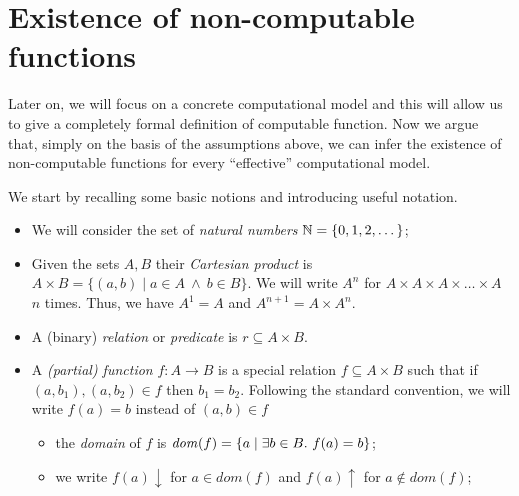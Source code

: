\section{Existence of non-computable functions}

Later on, we will focus on a concrete computational model and this
will allow us to give a completely formal definition of computable
function. Now we argue that, simply on the basis of the assumptions
above, we can infer the existence of non-computable functions for
every ``effective'' computational model.

We start by recalling some basic notions and introducing useful notation.

\begin{itemize}
\item We will consider the set of \emph{natural numbers}
  $\mathbb{N} = \{ 0, 1, 2, \dots \}$;

\item Given the sets $A, B$ their \emph{Cartesian product} is
  $A \times B = \{ (a,b) \mid a \in A\ \land\ b \in B\}$. We will
  write $A^n$ for $A \times A \times A \times \ldots \times A$ $n$
  times. Thus, we have $A^1 = A$ and $A^{n+1} = A \times A^n$.

\item A (binary) \emph{relation} or \emph{predicate} is
  $r \subseteq A \times B$.

\item A \emph{(partial) function} $f : A \to B$ is a special relation $f \subseteq A\times B$ such that if $(a, b_1), (a, b_2) \in f$ then  $b_1 = b_2$.  Following the standard convention, we will write $f(a) = b$ instead
  of $(a, b)\in f$
  \begin{itemize}
  \item the \emph{domain} of $f$ is
    $\mathit{dom}({f}) = \{a \mid \exists b \in B.\ f(a) = b \}$;

  \item we write $f(a) \downarrow$ for $a \in dom (f)$ and
    $f(a) \uparrow$ for $a \not\in dom (f)$;
  \end{itemize}


\end{itemize}
